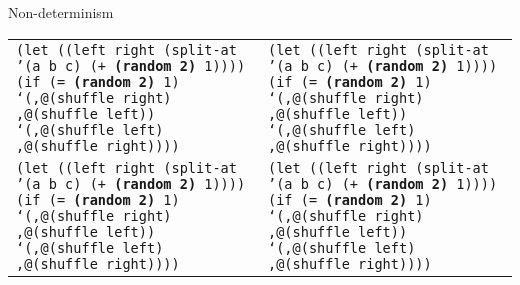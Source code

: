 \begin{frame}{Non-determinism}
  \tiny
  \begin{tabularx}{\textwidth}{ X X }
    \texttt{(let ((left right (split-at '(a b c)\newline
      \hphantom{\_\_\_\_\_\_\_\_\_\_\_\_\_\_\_\_\_\_\_}
      (+ \textbf{(random 2)} 1))))\newline
      \hphantom{\_\_}(if (= \textbf{(random 2)} 1)\newline
      \hphantom{\_\_\_\_\_\_}`(,@(shuffle right)\newline
      \hphantom{ \_\_\_\_\_\_\_},@(shuffle left))\newline
      \hphantom{ \_\_\_\_}`(,@(shuffle left)\newline
      \hphantom{ \_\_\_\_\_\_},@(shuffle right))))\newline
      \ 
    }
    &
    \texttt{(let ((left right (split-at '(a b c)\newline
      \hphantom{\_\_\_\_\_\_\_\_\_\_\_\_\_\_\_\_\_\_\_}
      (+ \textbf{(random 2)} 1))))\newline
      \hphantom{\_\_}(if (= \textbf{(random 2)} 1)\newline
      \hphantom{\_\_\_\_\_\_}`(,@(shuffle right)\newline
      \hphantom{ \_\_\_\_\_\_\_},@(shuffle left))\newline
      \hphantom{ \_\_\_\_}`(,@(shuffle left)\newline
      \hphantom{ \_\_\_\_\_\_},@(shuffle right))))\newline
      \ 
    }

    \\
    
    \texttt{(let ((left right (split-at '(a b c)\newline
      \hphantom{\_\_\_\_\_\_\_\_\_\_\_\_\_\_\_\_\_\_\_}
      (+ \textbf{(random 2)} 1))))\newline
      \hphantom{\_\_}(if (= \textbf{(random 2)} 1)\newline
      \hphantom{\_\_\_\_\_\_}`(,@(shuffle right)\newline
      \hphantom{ \_\_\_\_\_\_\_},@(shuffle left))\newline
      \hphantom{ \_\_\_\_}`(,@(shuffle left)\newline
      \hphantom{ \_\_\_\_\_\_},@(shuffle right))))\newline
      \ 
    }
    &
    \texttt{(let ((left right (split-at '(a b c)\newline
      \hphantom{\_\_\_\_\_\_\_\_\_\_\_\_\_\_\_\_\_\_\_}
      (+ \textbf{(random 2)} 1))))\newline
      \hphantom{\_\_}(if (= \textbf{(random 2)} 1)\newline
      \hphantom{\_\_\_\_\_\_}`(,@(shuffle right)\newline
      \hphantom{ \_\_\_\_\_\_\_},@(shuffle left))\newline
      \hphantom{ \_\_\_\_}`(,@(shuffle left)\newline
      \hphantom{ \_\_\_\_\_\_},@(shuffle right))))\newline
      \ 
    }


\end{tabularx}
\end{frame}
